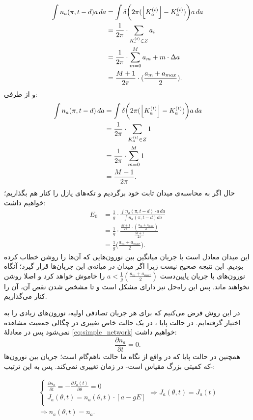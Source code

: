 \begin{align}
	\int n_a(\pi,t-d)a\,da &= \int \delta \bigg( 2\pi ( \left\lfloor K^{(t)}_a \right\rfloor - K^{(t)}_a) \bigg) a\,da\\
	&= \frac{1}{2\pi} \cdot \sum_{K^{(t)}_a \in Z} a_i \\
	&= \frac{1}{2\pi} \cdot \sum^{M}_{m=0} a_m + m \cdot \Delta a\\
	&= \frac{M+1}{2\pi} \cdot ( \frac{a_m +a_{max} }{2} ).\\
\end{align}
و از طرفی:
\begin{align}
	\int n_a(\pi,t-d)\,da &= \int \delta \bigg( 2\pi ( \left\lfloor K^{(t)}_a \right\rfloor - K^{(t)}_a) \bigg) a\,da\\
	&= \frac{1}{2\pi} \cdot \sum_{K^{(t)}_a \in Z} 1 \\
	&= \frac{1}{2\pi} \cdot \sum^{M}_{m=0}  1\\
	&= \frac{M+1}{2\pi}.
\end{align}
حال اگر به محاسبه‌ی میدان ثابت خود برگردیم و تکه‌های پازل را کنار هم بگذاریم؛ خواهیم داشت:
\begin{align}
	E_0 &= \frac{1}{g}\cdot \frac{\int n_a(\pi,t-d)\cdot a\,da}{\int n_a(\pi,t-d) da } \\
	&= \frac{1}{g}\cdot \frac{ \frac{M+1}{2\pi} \cdot ( \frac{a_m +a_{max} }{2} ) }{ \frac{M+1}{2\pi} } \\
	&= \frac{1}{g} \big( \frac{a_m +a_{max} }{2} \big) .
\end{align}
این میدان معادل است با جریان میانگین بین نورون‌هایی که آن‌ها را روشن خطاب کرده بودیم. این نتیجه صحیح نیست زیرا اگر میدان در میانه‌ی این جریان‌ها قرار گیرد؛ آنگاه نورون‌های با جریان پایین‌دست 
$a < \frac{1}{g} ( \frac{a_m +a_{max} }{2} ) $
را خاموش خواهد کرد و اصلا روشن نخواهند ماند. پس این راه‌حل نیز دارای مشکل است و تا مشخص شدن نقص آن، آن را کنار می‌گذاریم.

در این روش فرض می‌کنیم که برای هر جریان تصادفی اولیه، نورون‌های زیادی را به اختیار گرفته‌ایم. در حالت پایا  ، در یک حالت خاص تغییری در چگالی جمعیت مشاهده نمی‌شود پس در معادلهٔ
\ref{eq:simple_network}
خواهیم داشت:
\begin{equation}
	\frac{\partial n_a}{\partial t} = 0 .
\end{equation}
همچنین در حالت پایا که در واقع از نگاه ما حالت ناهم‌گام است؛ جریان بین نورون‌ها -که کمیتی بزرگ مقیاس است- در زمان تغییری نمی‌کند. پس به این ترتیب:

\begin{align}
	\begin{cases}
		\frac{\partial n_a}{\partial t} = - \frac{\partial J_{a}(t)}{\partial \theta} = 0\\
		J_{a}(\theta, t) = n_a(\theta,t) \cdot [ a - g E ]\\
	\end{cases}
	\Rightarrow J_{a}(\theta, t) = J_{a}(t)\\
	\Rightarrow n_{a}(\theta, t) = n_{a} .\\
\end{align}

